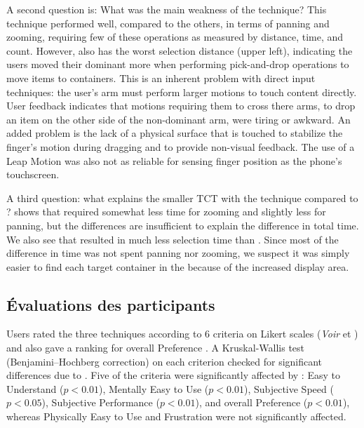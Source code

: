 
A second question is: What was the main weakness of the  technique? This technique performed well, compared to the others, in terms of panning and zooming, requiring few of these operations as measured by distance, time, and count. However,  also has the worst selection distance  (upper left), indicating the users moved their dominant more when performing pick-and-drop operations to move items to containers. This is an inherent problem with direct input techniques: the user's arm must perform larger motions to touch content directly. User feedback indicates that motions requiring them to cross there arms, to drop an item on the other side of the non-dominant arm, were tiring or awkward. An added problem is the lack of a physical surface that is touched to stabilize the finger's motion during dragging and to provide non-visual feedback. The use of a Leap Motion was also not as reliable for sensing finger position as the phone's touchscreen.

A third question: what explains the smaller TCT with the  technique compared to ?  shows that  required somewhat less time for zooming and slightly less for panning, but the differences are insufficient to explain the difference in total time. We also see that  resulted in much less selection time than . Since most of the difference in time was not spent panning nor zooming, we suspect it was simply easier to find each target container in the  because of the increased display area.

\subsection{Évaluations des participants}
\label{subsec:experiment_results_evaluations}

Users rated the three techniques according to 6 criteria on Likert scales (\textit{Voir}  et ) and also gave a ranking for overall Preference . A Kruskal-Wallis test (Benjamini–Hochberg correction) on each criterion checked for significant differences due to . Five of the criteria were significantly affected by : Easy to Understand ($p<0.01$), Mentally Easy to Use ($p<0.01$), Subjective Speed ($p<0.05$), Subjective Performance ($p<0.01$), and overall Preference ($p<0.01$), whereas Physically Easy to Use and Frustration were not significantly affected.

